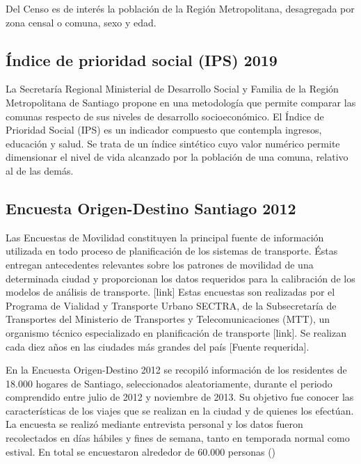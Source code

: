 Del Censo es de interés la población de la Región Metropolitana, desagregada por zona censal o comuna, sexo y edad. \\


\subsection{\'Indice de prioridad social (IPS) 2019}


La Secretaría Regional Ministerial de Desarrollo Social y Familia de la Región Metropolitana de Santiago propone en \cite{SEREMIRM2019} una metodología que permite comparar las comunas respecto de sus niveles de desarrollo socioeconómico. El Índice de Prioridad Social (IPS) es un indicador compuesto que contempla ingresos, educación y salud. Se trata de un índice sintético cuyo valor numérico permite dimensionar el nivel de vida alcanzado por la población de una comuna, relativo al de las demás. \\ 


\subsection{Encuesta Origen-Destino Santiago 2012}

Las Encuestas de Movilidad constituyen la principal fuente de información utilizada en todo proceso de planificación de los sistemas de transporte. Éstas entregan antecedentes relevantes sobre los patrones de movilidad de una determinada ciudad y proporcionan los datos requeridos para la calibración de los modelos de análisis de transporte. [link] %
Estas encuestas son realizadas por el Programa de Vialidad y Transporte Urbano SECTRA, de la Subsecretaría de Transportes del Ministerio de Transportes y Telecomunicaciones (MTT), un organismo técnico especializado en planificación de transporte [link]. Se realizan cada diez años en las ciudades más grandes del país [Fuente requerida].

En la Encuesta Origen-Destino 2012 se recopiló información de los residentes de 18.000 hogares de Santiago, seleccionados aleatoriamente, durante el periodo comprendido entre julio de 2012 y noviembre de 2013. Su objetivo fue conocer las características de los viajes que se realizan en la ciudad y de quienes los efectúan. La encuesta se realizó mediante entrevista personal y los datos fueron recolectados en días hábiles y fines de semana, tanto en temporada normal como estival. En total se encuestaron alrededor de 60.000 personas (\cite{SECTRA2014})

